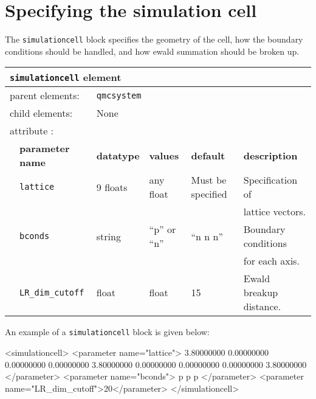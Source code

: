 \section{Specifying the simulation cell}
\label{chap:simulationcell}

The \texttt{simulationcell} block specifies the geometry of the cell, how the boundary conditions should be handled, and how ewald summation should be broken up.

\begin{table}[h]
\begin{center}
\begin{tabularx}{\textwidth}{l l l l l l }
\hline
\multicolumn{6}{l}{\texttt{simulationcell} element} \\
\hline
\multicolumn{2}{l}{parent elements:} & \multicolumn{4}{l}{\texttt{qmcsystem}}\\
\multicolumn{2}{l}{child  elements:} & \multicolumn{4}{l}{None}\\
\multicolumn{2}{l}{attribute      :} & \multicolumn{4}{l}{}\\
   &   \bfseries parameter name            & \bfseries datatype & \bfseries values & \bfseries default   & \bfseries description \\
\hline
   &   \texttt{lattice}  & 9 floats & any float & Must be specified & Specification of \\
   &                     &        &             &                   & lattice vectors. \\
   &   \texttt{bconds}   & string & ``p'' or ``n''  & ``n n n'' & Boundary conditions \\
   &                     &        &             &           & for each axis. \\
   &   \texttt{LR\_dim\_cutoff} & float & float & 15        & Ewald breakup distance. \\
\hline
\end{tabularx}
\end{center}
\end{table}

An example of a \texttt{simulationcell} block is given below:
\begin{shade}
 <simulationcell>
 <parameter name="lattice">
                 3.80000000       0.00000000       0.00000000
                 0.00000000       3.80000000       0.00000000
                 0.00000000       0.00000000       3.80000000
         </parameter>
         <parameter name="bconds">
            p p p
         </parameter>
         <parameter name="LR_dim_cutoff">20</parameter>
</simulationcell>
\end{shade}

